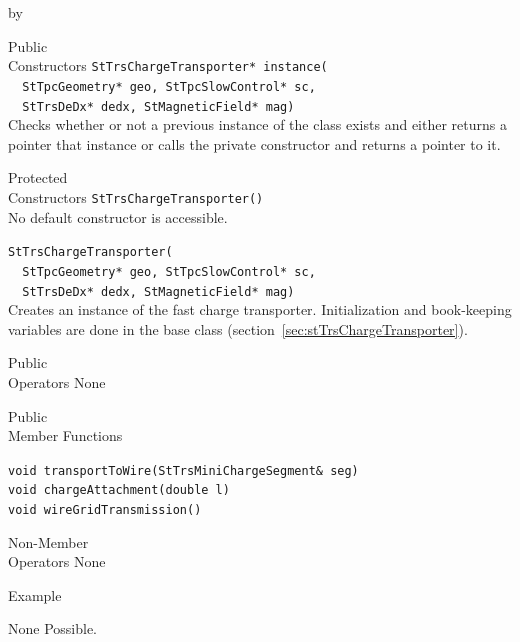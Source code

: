 \documentclass[twoside]{article}
\newcommand{\entrylabel}[1]{\mbox{\textbf{{#1}}}\hfil}%
\newenvironment{entry}
{\begin{list}{}%
    {\renewcommand{\makelabel}{\entrylabel}%
     \setlength{\labelwidth}{90pt}%
     \setlength{\leftmargin}{\labelwidth}
     \advance\leftmargin by \labelsep%
      }%
    }%
  {\end{list}}
\newcommand{\Entrylabel}[1]%
{\raisebox{0pt}[1ex][0pt]{\makebox[\labelwidth][l]%
    {\parbox[t]{\labelwidth}{\hspace{0pt}\textbf{{#1}}}}}}
\newenvironment{Entry}%
{\renewcommand{\entrylabel}{\Entrylabel}\begin{entry}}%
  {\end{entry}}
\begin{document}
\begin{Entry}
\item[Public \\ Constructors]
 \verb+StTrsChargeTransporter* instance(+\\
 \verb+  StTpcGeometry* geo, StTpcSlowControl* sc,+\\
 \verb+  StTrsDeDx* dedx, StMagneticField* mag)+\\
   Checks whether or not a previous instance of the class exists and
   either returns a pointer that instance or calls the private constructor
   and returns a pointer to it.

\item[Protected \\ Constructors]
   \verb+StTrsChargeTransporter()+\\
   No default constructor is accessible.

   \verb+StTrsChargeTransporter(+\\
   \verb+  StTpcGeometry* geo, StTpcSlowControl* sc,+\\
   \verb+  StTrsDeDx* dedx, StMagneticField* mag)+\\
   Creates an instance of the fast charge transporter.  Initialization and
   book-keeping variables are done in the base class 
   (section~\ref{sec:stTrsChargeTransporter}).

\item[Public \\ Operators]
   None

\item[Public \\ Member Functions]

  \verb+void transportToWire(StTrsMiniChargeSegment& seg)+\\

  \verb+void chargeAttachment(double l)+\\
 
  \verb+void wireGridTransmission()+\\

\item[Non-Member \\ Operators]
  None
  
\item[Example]

None Possible.

\end{Entry}
\clearpage

\end{document}
